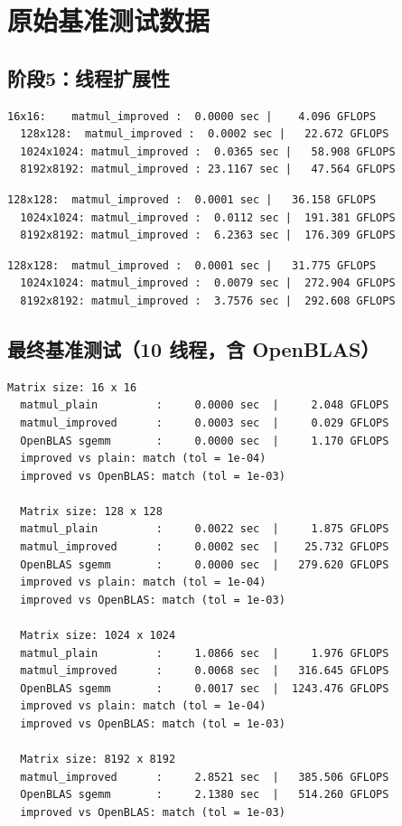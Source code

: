 \appendix
\section{原始基准测试数据}

\subsection{阶段5：线程扩展性}

\begin{lstlisting}[language={},caption={1 线程}]
  16x16:    matmul_improved :  0.0000 sec |    4.096 GFLOPS
  128x128:  matmul_improved :  0.0002 sec |   22.672 GFLOPS
  1024x1024: matmul_improved :  0.0365 sec |   58.908 GFLOPS
  8192x8192: matmul_improved : 23.1167 sec |   47.564 GFLOPS
\end{lstlisting}

\begin{lstlisting}[language={},caption={4 线程（仅 P 核）}]
  128x128:  matmul_improved :  0.0001 sec |   36.158 GFLOPS
  1024x1024: matmul_improved :  0.0112 sec |  191.381 GFLOPS
  8192x8192: matmul_improved :  6.2363 sec |  176.309 GFLOPS
\end{lstlisting}

\begin{lstlisting}[language={},caption={10 线程（全部核心）}]
  128x128:  matmul_improved :  0.0001 sec |   31.775 GFLOPS
  1024x1024: matmul_improved :  0.0079 sec |  272.904 GFLOPS
  8192x8192: matmul_improved :  3.7576 sec |  292.608 GFLOPS
\end{lstlisting}

\subsection{最终基准测试（10 线程，含 OpenBLAS）}

\begin{lstlisting}[language={},caption={最终基准测试输出}]
  Matrix size: 16 x 16
  matmul_plain         :     0.0000 sec  |     2.048 GFLOPS
  matmul_improved      :     0.0003 sec  |     0.029 GFLOPS
  OpenBLAS sgemm       :     0.0000 sec  |     1.170 GFLOPS
  improved vs plain: match (tol = 1e-04)
  improved vs OpenBLAS: match (tol = 1e-03)

  Matrix size: 128 x 128
  matmul_plain         :     0.0022 sec  |     1.875 GFLOPS
  matmul_improved      :     0.0002 sec  |    25.732 GFLOPS
  OpenBLAS sgemm       :     0.0000 sec  |   279.620 GFLOPS
  improved vs plain: match (tol = 1e-04)
  improved vs OpenBLAS: match (tol = 1e-03)

  Matrix size: 1024 x 1024
  matmul_plain         :     1.0866 sec  |     1.976 GFLOPS
  matmul_improved      :     0.0068 sec  |   316.645 GFLOPS
  OpenBLAS sgemm       :     0.0017 sec  |  1243.476 GFLOPS
  improved vs plain: match (tol = 1e-04)
  improved vs OpenBLAS: match (tol = 1e-03)

  Matrix size: 8192 x 8192
  matmul_improved      :     2.8521 sec  |   385.506 GFLOPS
  OpenBLAS sgemm       :     2.1380 sec  |   514.260 GFLOPS
  improved vs OpenBLAS: match (tol = 1e-03)
\end{lstlisting}

